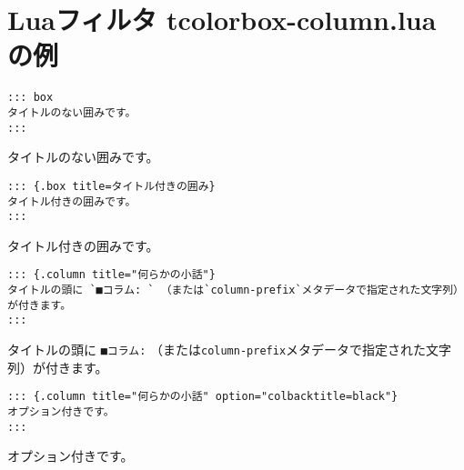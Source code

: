 \documentclass[
  a4paper,
  lualatex,
  ja=standard]{bxjsarticle}
\author{}
\date{}
\begin{document}

\hypertarget{luaux30d5ux30a3ux30ebux30bf-tcolorbox-column.lua-ux306eux4f8b}{%
\section{Luaフィルタ tcolorbox-column.lua
の例}\label{luaux30d5ux30a3ux30ebux30bf-tcolorbox-column.lua-ux306eux4f8b}}

\begin{verbatim}
::: box
タイトルのない囲みです。
:::
\end{verbatim}

\begin{tcolorbox}

タイトルのない囲みです。

\end{tcolorbox}

\begin{verbatim}
::: {.box title=タイトル付きの囲み}
タイトル付きの囲みです。
:::
\end{verbatim}

\begin{tcolorbox}[title=タイトル付きの囲み,]

タイトル付きの囲みです。

\end{tcolorbox}

\begin{verbatim}
::: {.column title="何らかの小話"}
タイトルの頭に `■コラム: ` （または`column-prefix`メタデータで指定された文字列）が付きます。
:::
\end{verbatim}

\begin{tcolorbox}[title=【コラム】何らかの小話,]

タイトルの頭に \texttt{■コラム:}
（または\texttt{column-prefix}メタデータで指定された文字列）が付きます。

\end{tcolorbox}

\begin{verbatim}
::: {.column title="何らかの小話" option="colbacktitle=black"}
オプション付きです。
:::
\end{verbatim}

\begin{tcolorbox}[title=【コラム】何らかの小話,colbacktitle=black]

オプション付きです。

\end{tcolorbox}
\end{document}
